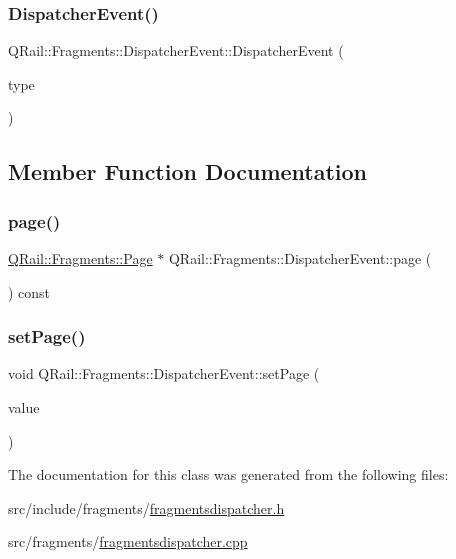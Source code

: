 \subsubsection{\texorpdfstring{DispatcherEvent()}{DispatcherEvent()}}
{\footnotesize\ttfamily Q\+Rail\+::\+Fragments\+::\+Dispatcher\+Event\+::\+Dispatcher\+Event (\begin{DoxyParamCaption}\item[{const Q\+Event\+::\+Type \&}]{type }\end{DoxyParamCaption})\hspace{0.3cm}{\ttfamily [inline]}}



\subsection{Member Function Documentation}
\mbox{\label{classQRail_1_1Fragments_1_1DispatcherEvent_a05e755262183efedfa43226a8ff3e752}} 
\subsubsection{\texorpdfstring{page()}{page()}}
{\footnotesize\ttfamily \mbox{\hyperlink{classQRail_1_1Fragments_1_1Page}{Q\+Rail\+::\+Fragments\+::\+Page}} $\ast$ Q\+Rail\+::\+Fragments\+::\+Dispatcher\+Event\+::page (\begin{DoxyParamCaption}{ }\end{DoxyParamCaption}) const}

\mbox{\label{classQRail_1_1Fragments_1_1DispatcherEvent_aa6808a5d6c31f9e9f86337493342f307}} 
\subsubsection{\texorpdfstring{setPage()}{setPage()}}
{\footnotesize\ttfamily void Q\+Rail\+::\+Fragments\+::\+Dispatcher\+Event\+::set\+Page (\begin{DoxyParamCaption}\item[{\mbox{\hyperlink{classQRail_1_1Fragments_1_1Page}{Q\+Rail\+::\+Fragments\+::\+Page}} $\ast$}]{value }\end{DoxyParamCaption})}



The documentation for this class was generated from the following files\+:\begin{DoxyCompactItemize}
\item 
src/include/fragments/\mbox{\hyperlink{fragmentsdispatcher_8h}{fragmentsdispatcher.\+h}}\item 
src/fragments/\mbox{\hyperlink{fragmentsdispatcher_8cpp}{fragmentsdispatcher.\+cpp}}\end{DoxyCompactItemize}
